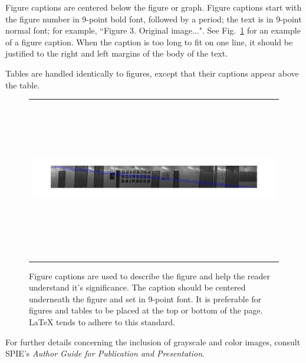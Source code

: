 \documentclass[]{spie}  %
\begin{document}
Figure captions are centered below the figure or graph.  Figure
captions start with the figure number in 9-point bold font, followed
by a period; the text is in 9-point normal font; for example,
``{\footnotesize{Figure 3.}  Original image...}".  See
Fig.~\ref{fig:example} for an example of a figure caption.  When the
caption is too long to fit on one line, it should be justified to the
right and left margins of the body of the text.

Tables are handled identically to figures, except that their captions
appear above the table.
\begin{figure}
  \begin{center}
    \begin{tabular}{c}
      \includegraphics[height=7cm]{naive.jpg}
    \end{tabular}
  \end{center}
  \caption[example]
  { \label{fig:example} Figure captions are used to describe the
    figure and help the reader understand it's significance.  The
    caption should be centered underneath the figure and set in
    9-point font.  It is preferable for figures and tables to be
    placed at the top or bottom of the page. LaTeX tends to adhere to
    this standard.}
\end{figure}

For further details concerning the inclusion of grayscale and color
images, consult SPIE's {\it Author Guide for Publication and
  Presentation}.
 
\end{document}
